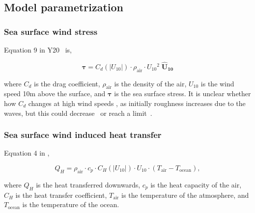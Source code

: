 \subsection{Model parametrization}
\label{sec:param}
\subsubsection{Sea surface wind stress}


Equation 9 in Y20~\cite{ZannaPreprint} is,

\begin{equation}
 \boldsymbol{\tau} = C_d(|U_{10}|)\cdot \rho_{\mathrm{air}} \cdot U_{10}{}^2  \;{}\mathbf{\hat{U}_{10}}
 \label{eq:tau}
 \end{equation}

where $C_d$ is the drag coefficient, $\rho_{\mathrm{air}}$ is the density of the air,
$U_{10}$ is the wind speed 10m above the surface, and $\boldsymbol{\tau}$ is the sea surface stress.
 It is unclear whether how $C_d$ changes at high wind speeds
 \cite{powell2003reduced}, as initially roughness increases
 due to the waves, but this could decrease~\cite{powell2003reduced}
 or reach a limit~\cite{donelan2004limiting}.


\subsubsection{Sea surface wind induced heat transfer}

% 

Equation 4 in \cite{zou2017observation},

\begin{equation}
Q_{H}=
\rho_{\mathrm{air}} \cdot c_{p} \cdot C_{H}(|U_{10}|) \cdot
U_{10} \cdot \left(T_{\mathrm{air}}
-T_{\mathrm{ocean}}\right),
\end{equation}

where $Q_{H}$ is the heat transferred downwards, $c_p$ is the heat capacity of the air,
$C_{H}$ is the heat transfer coefficient,
$T_{\mathrm{air}}$ is the temperature of the atmosphere, and
$T_{\mathrm{ocean}}$ is the temperature of the ocean.
